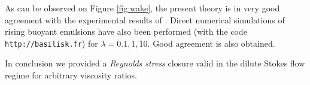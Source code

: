 \documentclass[12pt,a4paper]{article}
\begin{document}
As can be observed on Figure \ref{fig:wake}, the present theory is in very good agreement with the experimental results of \cite{cartellier2009induced}.  
Direct numerical simulations of rising buoyant emulsions have also been performed (with the code \texttt{http://basilisk.fr}) for $\lambda = 0.1,1,10$. Good agreement is also obtained. 

In conclusion we provided a \textit{Reynolds stress} closure valid in the dilute Stokes flow regime for arbitrary viscosity ratios. 

 



\end{document}

